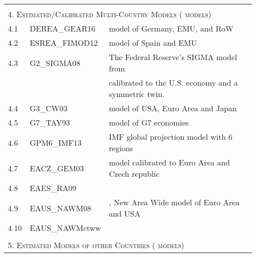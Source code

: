 \documentclass[11pt,a4paper]{article}
\begin{document}
	
	\vspace{-1cm}
	
	\begin{table}[H]
		\begin{tabularx}{\textwidth}{lll}
			\hline \hline
			&& \\
		\multicolumn{3}{l}{\textsc{4. Estimated/Calibrated Multi-Country Models (\the\value{MCnumber} models)}} \\
		
		4.1& DEREA\_GEAR16 & \cite{gadatsch2016fiscal} model of Germany, EMU, and RoW\\
		4.2 & ESREA\_FIMOD12 & \cite{stahler2012fimod} model of Spain and EMU\\
			4.3& G2\_SIGMA08 & The Federal Reserve's SIGMA model from \cite{ErcegGuerrieriGust2008}\\
			& & calibrated to the U.S. economy and a symmetric twin.\\
			4.4 & G3\_CW03 & \cite{CoenenWieland2002} model of USA, Euro Area and Japan \\
			
			4.5 & G7\_TAY93 & \cite{Taylor1993a} model of G7 economies \\
			
			4.6 & GPM6\_IMF13 & IMF global projection model with 6 regions \cite{Carabenciovetal2013}\\
			
			4.7 & EACZ\_GEM03 & \cite{LaxtonPesenti2003} model calibrated to Euro Area and Czech republic\\
			
			4.8 & EAES\_RA09 & \cite{Rabanal2009}\\
			
			4.9 & EAUS\_NAWM08 & \cite{CoenenMcAdamStraub2008}, New Area Wide model of Euro Area and USA \\
			
			4.10\footnotemark[1] & EAUS\_NAWMctww & \cite{CoganTaylorWielandWolters2013}	\\%
			&&\\
			\multicolumn{3}{l}{\textsc{5. Estimated Models of other Countries (\the\value{OCnumber} models)}} \\
			

\end{tabularx}
\end{table}
\end{document}
